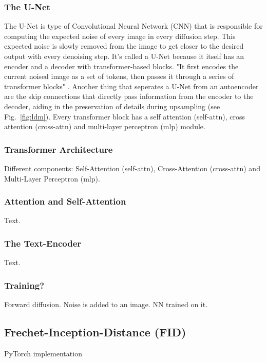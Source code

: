 \subsubsection{The U-Net}
The U-Net is type of Convolutional Neural Network (CNN) that is responsible for computing the expected noise of every image in every diffusion step. This expected noise is slowly removed from the image to get closer to the desired output with every denoising step. It's called a U-Net because it itself has an encoder and a decoder with transformer-based blocks. "It first encodes the current
noised image as a set of tokens, then passes it through a
series of transformer blocks" \cite{bolya2023tomesd}. Another thing that seperates a U-Net from an autoencoder are the skip connections that directly pass information from the encoder to the decoder, aiding in the preservation of details during upsampling (see Fig.~\ref{fig:ldm}). Every transformer block has a self attention (self-attn), cross attention (cross-attn) and multi-layer perceptron (mlp) module.



\subsubsection{Transformer Architecture}
Different components: Self-Attention (self-attn), Cross-Attention (cross-attn) and Multi-Layer Perceptron (mlp).



\subsubsection{Attention and Self-Attention}
Text.



\subsubsection{The Text-Encoder}
Text.



\subsubsection{Training?}
Forward diffusion. Noise is added to an image. NN trained on it.



\subsection{Frechet-Inception-Distance (FID)}
PyTorch implementation\cite{Seitzer2020FID}



